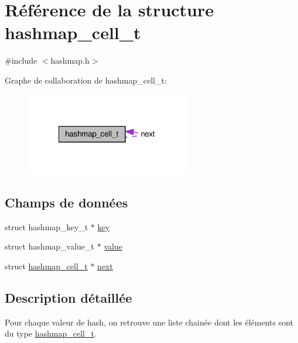 \hypertarget{structhashmap__cell__t}{\section{Référence de la structure hashmap\-\_\-cell\-\_\-t}
\label{structhashmap__cell__t}
}


{\ttfamily \#include $<$hashmap.\-h$>$}



Graphe de collaboration de hashmap\-\_\-cell\-\_\-t\-:\nopagebreak
\begin{figure}[H]
\begin{center}
\leavevmode
\includegraphics[width=203pt]{structhashmap__cell__t__coll__graph}
\end{center}
\end{figure}
\subsection*{Champs de données}
\begin{DoxyCompactItemize}
\item 
struct hashmap\-\_\-key\-\_\-t $\ast$ \hyperlink{structhashmap__cell__t_a18fa668e172072e9bff5e92e52d9f3af}{key}
\item 
struct hashmap\-\_\-value\-\_\-t $\ast$ \hyperlink{structhashmap__cell__t_aa0758cf139adb3747a846e539d01d75d}{value}
\item 
struct \hyperlink{structhashmap__cell__t}{hashmap\-\_\-cell\-\_\-t} $\ast$ \hyperlink{structhashmap__cell__t_afea1a8c217d80c95efa5b4a89ea07bf2}{next}
\end{DoxyCompactItemize}


\subsection{Description détaillée}
Pour chaque valeur de hash, on retrouve une liste chainée dont les éléments sont du type \hyperlink{structhashmap__cell__t}{hashmap\-\_\-cell\-\_\-t}. 

